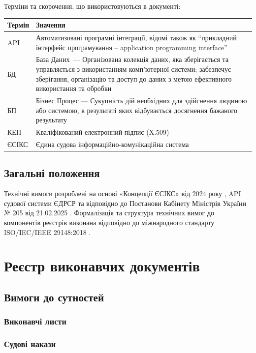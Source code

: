 \documentclass{article}
\begin{document}
Терміни та скорочення, що використовуються в документі:

\begin{longtable}{p{4cm}p{10cm}}
\toprule
\textbf{Термін} & \textbf{Значення} \\
\midrule
API & Автоматизовані програмні інтеграції, відомі також як “прикладний інтерфейс програмування – application programming interface” \\
БД & База Даних — Організована колекція даних, яка зберігається та управляється з використанням комп'ютерної системи; забезпечує зберігання, організацію та доступ до даних з метою ефективного використання та обробки \\
БП & Бізнес Процес — Сукупність дій необхідних для здійснення людиною або системою, в результаті яких відбувається досягнення бажаного результату \\
КЕП & Кваліфікований електронний підпис (X.509) \\
ЄСІКС & Єдина судова інформаційно-комунікаційна система \\
\bottomrule
\end{longtable}

\subsection*{Загальні положення}

Технічні вимоги розроблені на основі «Концепції ЄСІКС» від 2024 року \cite{esiks}, API судової системи ЄДРСР \cite{eCourt} та відповідно до Постанови Кабінету Міністрів України № 205 від 21.02.2025 \cite{law:kmu205}. Формалізація та структура технічних вимог до компонентів реєстрів виконана відповідно до міжнародного стандарту ISO/IEC/IEEE 29148:2018 \cite{iso:29148}.

\newpage
\section{Реєстр виконавчих документів}

\subsection{Вимоги до сутностей}

\subsubsection{Виконавчі листи}
\subsubsection{Судові накази}
\end{document}
